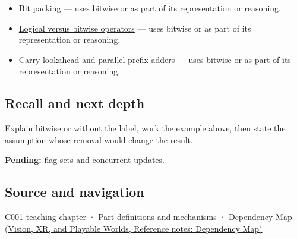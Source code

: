 \begin{itemize}
\tightlist
\item
  \hyperref[appendix-1f9963e1a5d1]{Bit packing} --- uses bitwise or as part of its representation or reasoning.
\item
  \hyperref[appendix-fe6b457d68d8]{Logical versus bitwise operators} --- uses bitwise or as part of its representation or reasoning.
\item
  \hyperref[appendix-b5c46b2d94ff]{Carry-lookahead and parallel-prefix adders} --- uses bitwise or as part of its representation or reasoning.
\end{itemize}

\subsection{Recall and next depth}\label{appendix-a427ce8ce8a6-recall-and-next-depth}

\hypertarget{appendix-a427ce8ce8a6-recall-and-next-depth}{}

Explain bitwise or without the label, work the example above, then state the assumption whose removal would change the result.

\textbf{Pending:} flag sets and concurrent updates.

\subsection{Source and navigation}\label{appendix-a427ce8ce8a6-source-and-navigation}

\hypertarget{appendix-a427ce8ce8a6-source-and-navigation}{}

\hyperref[01-foundations-i-ch001-from-a-signal-to-an-interpretation]{C001 teaching chapter} · \hyperref[appendix-fd090d982a15]{Part definitions and mechanisms} · \href{../07-Vision-XR-and-Playable-Worlds/main.pdf\#nameddest=appendix-4ad47bdd269a}{Dependency Map (Vision, XR, and Playable Worlds, Reference notes: Dependency Map)}
